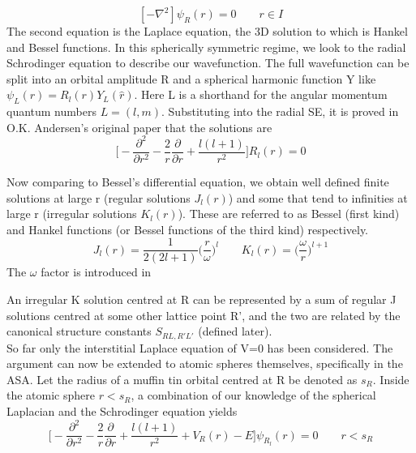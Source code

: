 \documentclass[12pt]{article}
\begin{document}
\begin{equation} \label{3.2} \tag{3.2}
[-\nabla^2]\psi_R(r)=0  \qquad r\in I
\end{equation}
The second equation is the Laplace equation, the 3D solution to which is Hankel and Bessel functions. In this spherically symmetric regime, we look to the radial Schrodinger equation to describe our wavefunction. The full wavefunction can be split into an orbital amplitude R and a spherical harmonic function Y like $\psi_L(r)=R_l(r)Y_L(\hat{r})$. Here L is a shorthand for the angular momentum quantum numbers $L=(l,m)$. Substituting into the radial SE, it is proved in O.K. Andersen's original paper\cite{andersen} that the solutions are
\begin{equation} \label{3.3} \tag{3.3}
\bigg[-\frac{\partial^2}{\partial r^2}-\frac{2}{r}\frac{\partial}{\partial r}+\frac{l(l+1)}{r^2} \bigg]R_l(r)=0
\end{equation}

Now comparing to Bessel's differential equation, we obtain well defined finite solutions at large r (regular solutions $J_l(r)$) and some that tend to infinities at large r (irregular solutions $K_l(r)$). These are referred to as Bessel (first kind) and Hankel functions (or Bessel functions of the third kind) respectively. 
\begin{equation} \label{3.4} \tag{3.4}
J_l(r)=\frac{1}{2(2l+1)}\bigg(\frac{r}{\omega}\bigg)^l \qquad K_l(r)=\bigg(\frac{\omega}{r}\bigg)^{l+1}
\end{equation}
The $\omega$ factor is introduced in \cite{andersen} 

An irregular K solution centred at R can be represented by a sum of regular J solutions centred at some other lattice point R', and the two are related by the canonical structure constants $S_{RL,R'L'}$ (defined later).
\\
So far only the interstitial Laplace equation of V=0 has been considered. The argument can now be extended to atomic spheres themselves, specifically in the ASA. Let the radius of a muffin tin orbital centred at R be denoted as $s_R$. Inside the atomic sphere $r<s_R$, a combination of our knowledge of the spherical Laplacian and the Schrodinger equation yields
\begin{equation} \label{3.5} \tag{3.5}
\bigg[-\frac{\partial^2}{\partial r^2}-\frac{2}{r}\frac{\partial}{\partial r}+\frac{l(l+1)}{r^2}+V_R(r)-E \bigg] \psi_R_l(r)=0 \qquad r<s_R
\end{equation}
\end{document}
